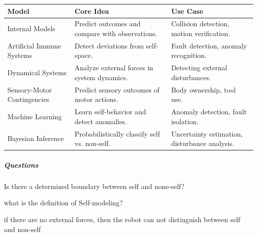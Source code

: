 \documentclass{book}
\begin{document}
\begin{tabular}{|l|p{6cm}|p{5cm}|}
    \hline
    \textbf{Model}              & \textbf{Core Idea}                              & \textbf{Use Case}                             \\ \hline
    Internal Models             & Predict outcomes and compare with observations. & Collision detection, motion verification.     \\ \hline
    Artificial Immune Systems   & Detect deviations from self-space.              & Fault detection, anomaly recognition.         \\ \hline
    Dynamical Systems           & Analyze external forces in system dynamics.     & Detecting external disturbances.              \\ \hline
    Sensory-Motor Contingencies & Predict sensory outcomes of motor actions.      & Body ownership, tool use.                     \\ \hline
    Machine Learning            & Learn self-behavior and detect anomalies.       & Anomaly detection, fault isolation.           \\ \hline
    Bayesian Inference          & Probabilistically classify self vs. non-self.   & Uncertainty estimation, disturbance analysis. \\ \hline
\end{tabular}

\subparagraph{Questions}
Is there a determined boundary between self and none-self?

what is the definition of Self-modeling?

if there are no external forces, then the robot can not distinguish between self and non-self
\end{document}

